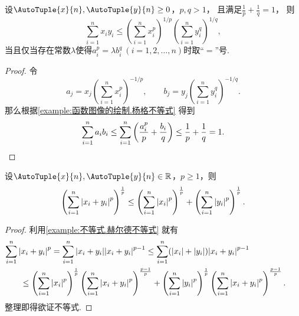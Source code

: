 \begin{example}[赫尔德不等式]\label{example:不等式.赫尔德不等式}
设\(\AutoTuple{x}{n},\AutoTuple{y}{n}\geq0\)，\(p,q>1\)，
且满足\(\frac{1}{p}+\frac{1}{q}=1\)，
则
\def\s{\sum_{i=1}^n}%
\def\sp#1#2#3{\left( \s #1^#2 \right)^{#3/#2}}%
\begin{equation}
	\s x_i y_i
	\leq
	\sp{x_i}{p}{1} \sp{y_i}{q}{1},
\end{equation}
当且仅当存在常数\(\lambda\)使得\(a_i^p = \lambda b_i^q\ (i=1,2,\dotsc,n)\)时取“\(=\)”号.
\begin{proof}
令\[
	a_j = x_j \sp{x_i}{p}{-1}, \qquad
	b_j = y_j \sp{y_i}{q}{-1}.
\]
那么根据\cref{example:函数图像的绘制.杨格不等式} 得到\[
	\s a_i b_i \leq \s \left( \frac{a_i^p}{p} + \frac{b_i}{q} \right)
	\leq \frac{1}{p} + \frac{1}{q} = 1.
	\qedhere
\]
\end{proof}
\end{example}

\begin{example}[闵可夫斯基不等式]\label{example:不等式.闵可夫斯基不等式}
设\(\AutoTuple{x}{n},\AutoTuple{y}{n}\in\mathbb{R}\)，\(p\geq1\)，则
\def\s{\sum_{i=1}^n}%
\def\sumonly#1{\s \abs{#1}^p}%
\newcommand\sumpower[2][1]{\left( \sumonly{#2} \right)^{\frac{#1}{p}}}%
\begin{equation}
	\sumpower{x_i+y_i} \leq \sumpower{x_i} + \sumpower{y_i}.
\end{equation}
\begin{proof}
利用\cref{example:不等式.赫尔德不等式} 就有\begin{align*}
	&\hspace{-20pt}\sumonly{x_i+y_i}
	= \s \abs{x_i+y_i} \abs{x_i+y_i}^{p-1}
	\leq \s (\abs{x_i}+\abs{y_i}) \abs{x_i+y_i}^{p-1} \\
	&\leq \sumpower{x_i} \sumpower[p-1]{x_i+y_i}
	+ \sumpower{y_i} \sumpower[p-1]{x_i+y_i}.
\end{align*}
整理即得欲证不等式.
\end{proof}
\end{example}
